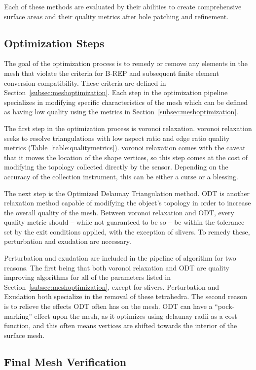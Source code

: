 \documentclass[12pt]{drexelthesis}
\let\Oldsubsection\subsection
\renewcommand{\subsection}{\FloatBarrier\Oldsubsection}
\begin{document}
Each of these methods are evaluated by their abilities to create comprehensive surface areas and their quality metrics after hole patching and refinement.

\subsection{Optimization Steps}

The goal of the optimization process is to remedy or remove any elements in the mesh that violate the criteria for B-REP and subsequent finite element conversion compatibility. These criteria are defined in Section~\ref{subsec:meshoptimization}. Each step in the optimization pipeline specializes in modifying specific characteristics of the mesh which can be defined as having low quality using the metrics in Section~\ref{subsec:meshoptimization}.

The first step in the optimization process is voronoi relaxation. voronoi relaxation seeks to resolve triangulations with low aspect ratio and edge ratio quality metrics (Table~\ref{table:qualitymetrics}). voronoi relaxation comes with the caveat that it moves the location of the shape vertices, so this step comes at the cost of modifying the topology collected directly by the sensor. Depending on the accuracy of the collection instrument, this can be either a curse or a blessing.

The next step is the Optimized Delaunay Triangulation method. ODT is another relaxation method capable of modifying the object's topology in order to increase the overall quality of the mesh. Between voronoi relaxation and ODT, every quality metric should -- while not guaranteed to be so -- be within the tolerance set by the exit conditions applied, with the exception of slivers. To remedy these, perturbation and exudation are necessary.

Perturbation and exudation are included in the pipeline of algorithm for two reasons. The first being that both voronoi relaxation and ODT are quality improving algorithms for all of the parameters listed in Section~\ref{subsec:meshoptimization}, except for slivers. Perturbation and Exudation both specialize in the removal of these tetrahedra. The second reason is to relieve the effects ODT often has on the mesh. ODT can have a ``pock-marking'' effect upon the mesh, as it optimizes using delaunay radii as a cost function, and this often means vertices are shifted towards the interior of the surface mesh. 
 

\subsection{Final Mesh Verification}
\end{document}

